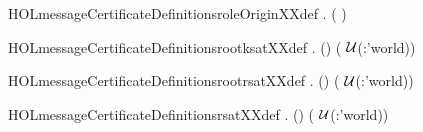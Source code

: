 \newcommand{\HOLmessageCertificateDefinitionsmsatXXdef}{\UseVerbatim{HOLmessageCertificateDefinitionsmsatXXdef}}
\begin{SaveVerbatim}{HOLmessageCertificateDefinitionsroleOriginXXdef}
\HOLTokenTurnstile{} \HOLSymConst{\HOLTokenForall{}}.  ( ) \HOLSymConst{=} 
\end{SaveVerbatim}
\newcommand{\HOLmessageCertificateDefinitionsroleOriginXXdef}{\UseVerbatim{HOLmessageCertificateDefinitionsroleOriginXXdef}}
\begin{SaveVerbatim}{HOLmessageCertificateDefinitionsrootksatXXdef}
\HOLTokenTurnstile{} \HOLSymConst{\HOLTokenForall{}}   .
     (\HOLSymConst{,}\HOLSymConst{,})   \HOLSymConst{\HOLTokenEquiv{}}
     (     \HOLSymConst{=} \ensuremath{\cal{U}}(:'world))
\end{SaveVerbatim}
\newcommand{\HOLmessageCertificateDefinitionsrootksatXXdef}{\UseVerbatim{HOLmessageCertificateDefinitionsrootksatXXdef}}
\begin{SaveVerbatim}{HOLmessageCertificateDefinitionsrootrsatXXdef}
\HOLTokenTurnstile{} \HOLSymConst{\HOLTokenForall{}}   .
     (\HOLSymConst{,}\HOLSymConst{,})   \HOLSymConst{\HOLTokenEquiv{}}
     (     \HOLSymConst{=} \ensuremath{\cal{U}}(:'world))
\end{SaveVerbatim}
\newcommand{\HOLmessageCertificateDefinitionsrootrsatXXdef}{\UseVerbatim{HOLmessageCertificateDefinitionsrootrsatXXdef}}
\begin{SaveVerbatim}{HOLmessageCertificateDefinitionsrsatXXdef}
\HOLTokenTurnstile{} \HOLSymConst{\HOLTokenForall{}}   .
     (\HOLSymConst{,}\HOLSymConst{,})   \HOLSymConst{\HOLTokenEquiv{}} (     \HOLSymConst{=} \ensuremath{\cal{U}}(:'world))
\end{SaveVerbatim}
\newcommand{\HOLmessageCertificateDefinitionsrsatXXdef}{\UseVerbatim{HOLmessageCertificateDefinitionsrsatXXdef}}
